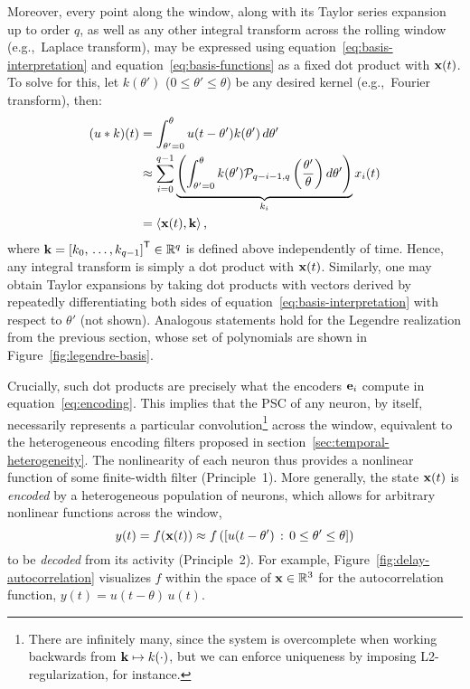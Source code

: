 Moreover, every point along the window, along with its Taylor series expansion up to order $q$, as well as any other integral transform across the rolling window (e.g.,~Laplace transform), may be expressed using equation~\ref{eq:basis-interpretation} and equation~\ref{eq:basis-functions} as a fixed dot product with $\mathbf{x}(t)$.
To solve for this, let $k(\theta')$ ($0 \le \theta' \le \theta$) be any desired kernel (e.g.,~Fourier transform), then:
\begin{equation} \label{eq:delay-linear-transform}
\begin{aligned}
(u \ast k)(t) &= \int_{\theta'=0}^{\theta} u(t - \theta') k(\theta') \, d\theta' \\
&\approx \sum_{i=0}^{q-1} \underbrace{\left( \int_{\theta'=0}^{\theta} k(\theta') \mathcal{P}_{q-i-1,q} \left(\frac{\theta'}{\theta} \right) d\theta' \right)}_{k_{i}} x_{i}(t) \\
&= \left\langle \mathbf{x}(t)\text{,}\, \mathbf{k} \right\rangle \text{,}
\end{aligned}
\end{equation}
where $\mathbf{k} = {\left[ k_0\text{,}\, \ldots \text{,}\, k_{q-1} \right]}^\mathsf{T} \in \mathbb{R}^q$ is defined above independently of time.
Hence, any integral transform is simply a dot product with $\mathbf{x}(t)$.
Similarly, one may obtain Taylor expansions by taking dot products with vectors derived by repeatedly differentiating both sides of equation~\ref{eq:basis-interpretation} with respect to $\theta'$ (not shown).
Analogous statements hold for the Legendre realization from the previous section, whose set of polynomials are shown in Figure~\ref{fig:legendre-basis}.

Crucially, such dot products are precisely what the encoders $\mathbf{e}_i$ compute in equation~\ref{eq:encoding}.
This implies that the PSC of any neuron, by itself, necessarily represents a particular convolution\footnote{%
There are infinitely many, since the system is overcomplete when working backwards from $\mathbf{k} \mapsto k(\cdot)$, but we can enforce uniqueness by imposing L2-regularization, for instance.}
across the window, equivalent to the heterogeneous encoding filters proposed in section~\ref{sec:temporal-heterogeneity}.
The nonlinearity of each neuron thus provides a nonlinear function of some finite-width filter (Principle~1).
More generally, the state $\mathbf{x}(t)$ is \emph{encoded} by a heterogeneous population of neurons, which allows for arbitrary nonlinear functions across the window,
$$y(t) = f(\mathbf{x}(t)) \approx f\left(\left[ u(t - \theta') \,:\, 0 \le \theta' \le \theta \right]\right)$$
to be \emph{decoded} from its activity (Principle~2).
For example, Figure~\ref{fig:delay-autocorrelation} visualizes $f$ within the space of $\mathbf{x} \in \mathbb{R}^3$ for the autocorrelation function, $y(t) = u(t - \theta)\, u(t)$.

